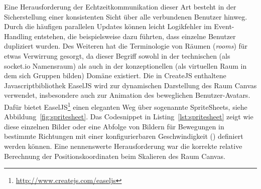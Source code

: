 Eine Herausforderung der Echtzeitkommunikation dieser Art besteht in der Sicherstellung einer konsistenten Sicht über alle verbundenen Benutzer hinweg. Durch die häufigen parallelen Updates können leicht Logikfehler im Event-Handling entstehen, die beispielsweise dazu führten, dass einzelne Benutzer dupliziert wurden. Des Weiteren hat die Terminologie von Räumen (\emph{rooms}) für etwas Verwirrung gesorgt, da dieser Begriff sowohl in der technischen (als socket.io Namensraum) als auch in der konzeptionellen (als virtuellen Raum in dem sich Gruppen bilden) Domäne existiert.
\newline\newline
Die in CreateJS enthaltene Javascriptbibliothek EaselJS wird zur dynamischen Darstellung des Raum Canvas verwendet, insbesondere auch zur Animation des beweglichen Benutzer-Avatars. Dafür bietet EaselJS\footnote{\url{http://www.createjs.com/easeljs}} einen eleganten Weg über sogenannte SpriteSheets, siehe Abbildung~\ref{fig:spritesheet}. Das Codesnippet in Listing~\ref{lst:spritesheet} zeigt wie diese einzelnen Bilder oder eine Abfolge von Bildern für Bewegungen in bestimmte Richtungen mit einer konfigurierbaren Geschwindigkeit () definiert werden können. Eine nennenswerte Herausforderung war die korrekte relative Berechnung der Positionskoordinaten beim Skalieren des Raum Canvas.

